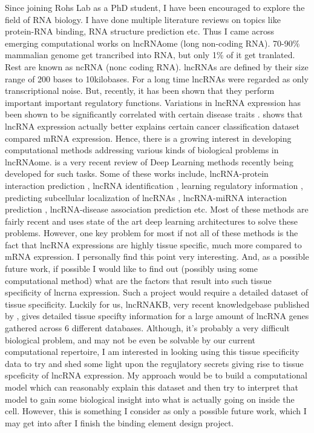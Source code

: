 Since joining Rohs Lab as a PhD student, I have been encouraged to explore the field of RNA biology.
I have done multiple literature reviews on topics like protein-RNA binding, RNA structure
prediction etc. Thus I came across emerging computational works on lncRNAome (long
non-coding RNA). 
70-90\% mammalian genome get trancribed into RNA, but only 1\% of it get tranlated. Rest are known
as ncRNA (nonc coding RNA). lncRNAs are defined by their size range of 200 bases to 10kilobases.
For a long time lncRNAs were regarded as only transcriptional noise. But, recently, it has been
shown that they perform important important regulatory functions. Variations in lncRNA expression
has been shown to be significantly correlated with certain disease traits \citep{wapinski2011long}. 
\citet{al2019long} shows that lncRNA expression actually better explains certain cancer
classification dataset compared mRNA expression. Hence, there is a growing interest in developing
computational methods addressing various kinds of biological problems in lncRNAome.
\citet{alam2020deep} is a very recent review of Deep Learning methods recently being developed for
such tasks. Some of these works include, lncRNA-protein interaction prediction
\citep{pan2016ipminer, zhao2018bipartite, yi2018deep, zhan2019bgfe, peng2019rpiter}, lncRNA 
identification \citep{baek2018lncrnanet,yang2018lncadeep, tripathi2016deeplnc},
learning regulatory information \citep{alam2019deepcnpp, alam2019deepel}, predicting subcellular
localization of lncRNAs \citep{gudenas2018prediction},    lncRNA-miRNA interaction prediction
\citep{huang2019predicting}, lncRNA-disease association prediction \citep{hu2019deep, xuan2019dual,
al2019long, xuan2019graph} etc. Most of these methods are fairly recent and uses state of the art
deep learning architectures to solve these problems. However, one key problem for most if not all of
these methods is the fact that lncRNA expressions are highly tissue specific, much more compared to
mRNA expression. I personally find this point very interesting. And, as a possible future work, if
possible I would like to find out (possibly using some computational method) what are the factors
that result into such tissue specificity of lncrna expression. Such a project would require a
detailed dataset of tissue specificity. Luckily for us, lncRNAKB,  very recent knowledgebase
published by \citet{seifuddin2020lncrnakb}, gives detailed tissue specifty information  for a large
amount of lncRNA genes gathered across 6 different databases. Although, it's probably a very
difficult biological problem, and may not be even be solvable by our current computational
repertoire, I am interested in looking using this tissue specificity data to try and shed some light
upon the regujlatory secrets giving rise to tissue spceficity of lncRNA expression. My approach
would be to build a computational model which can reasonably explain this dataset and then try to
interpret that model to gain some biological insight into what is actually going on inside the cell. 
However, this is something I consider as only a possible future work, which I may get into after I finish the binding
element design project. 

